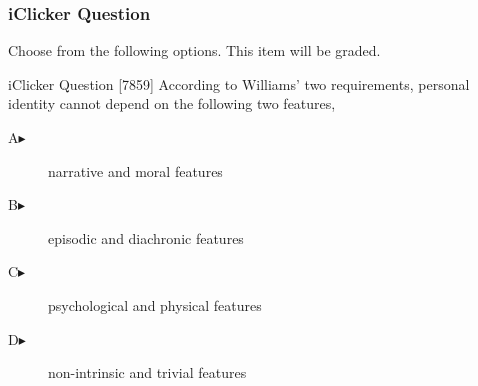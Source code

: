 \begin{frame}
  \frametitle{iClicker Question}
Choose from the following options. This item will be graded.
\begin{block}{iClicker Question}
[7859] According to Williams' two requirements, personal identity
cannot depend on the following two features,
\end{block}
\begin{description}
\item[A\hspace{.2in}$\blacktriangleright$] narrative and moral features
\item[B\hspace{.2in}$\blacktriangleright$] episodic and diachronic features
\item[C\hspace{.2in}$\blacktriangleright$] psychological and physical features
\item[D\hspace{.2in}$\blacktriangleright$] non-intrinsic and trivial features
\end{description}
\end{frame}
